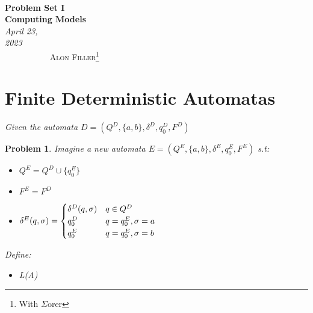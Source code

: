 \documentclass[12pt]{article}
\renewcommand{\=}[1]{\stackrel{#1}{=}} %
\newtheorem{p}{Problem}[section]
\theoremstyle{definition}
\begin{document}
{\noindent\Huge\bf  \\[0.5\baselineskip] {\selectfont  Problem Set I}         }\\[2\baselineskip] %
{ {\bf {}\selectfont Computing Models}\\ {\textit{\selectfont     April 23, 2023}}}~~~~~~~~~~~~~~~~~~~~~~~~~~~~~~~~~~~~~~~~~~~~~~~~~~~~~~~~~~~~~~~~~~~~~~~~~~~~~    {\large \textsc{Alon Filler}\footnote{With $\Sigma$orer}} %
\\[1.4\baselineskip] 



\section{Finite Deterministic Automatas}
\emph{Given the automata $D = (Q^{D}, \{a,b\}, \delta^{D}, q_0^{D}, F^{D})$} \newline
\begin{p}
\emph{\newline Imagine a new automata $E = (Q^{E}, \{a,b\}, \delta^{E}, q_0^{E}, F^{E})$} s.t:
\begin{itemize}
  \item $Q^{E} = Q^{D} \cup \{q_0^{E}\}$
  \item $F^{E} = F^{D}$
  \item \(
    \hspace{0mm}
    \delta^{E}(q, \sigma) = 
    \begin{cases}
      \delta^{D}(q, \sigma) & q \in Q^{D} \\
        q_0^{D} & q = q_0^{E}, \sigma = a \\ 
        q_0^{E} & q = q_0^{E}, \sigma = b
    \end{cases}
  \)
\end{itemize}

Define: 
\begin{itemize}
  \item L(A)
\end{itemize}
\end{p}
\end{document}
